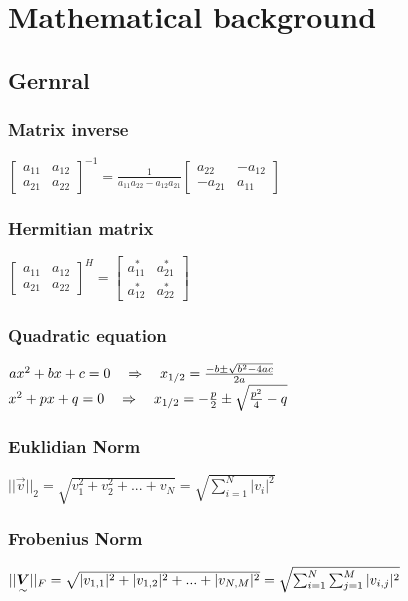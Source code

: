 \section{Mathematical background}
\subsection{Gernral}
\subsubsection{Matrix inverse}
$\begin{bmatrix}a_{11}&a_{12}\\a_{21}&a_{22}\end{bmatrix}^{-1}=
\frac{1}{a_{11}a_{22}-a_{12}a_{21}}\begin{bmatrix}a_{22}&-a_{12}\\-a_{21}&a_{11}\end{bmatrix}$
\subsubsection{Hermitian matrix}
$\begin{bmatrix}a_{11}&a_{12}\\a_{21}&a_{22}\end{bmatrix}^{H}=
\begin{bmatrix}a_{11}^*&a_{21}^*\\a_{12}^*&a_{22}^*\end{bmatrix}$

\subsubsection{Quadratic equation}
$ax^2+bx+c=0\quad\Rightarrow\quad x_{1/2}=\frac{-b\pm\sqrt{b^2-4ac}}{2a}$\\
$x^2 + px + q=0 \quad\Rightarrow\quad x_{1/2}=-\frac{p}{2} \pm \sqrt{\frac{p^2}{4}-q} $\\

\subsubsection{Euklidian Norm}
$||\vec{v}||_2=\sqrt{v_1^2 + v_2^2 + ... + v_N} = \sqrt{\sum_{i=1}^{N}|v_i|^2}$
\subsubsection{Frobenius Norm}
$||\underset{\sim}{\boldsymbol {V}}||_F=\sqrt{|v_{1,1}|^2 + |v_{1,2}|^2+... + |v_{N,M}|^2} =\sqrt{\sum_{i=1}^{N} \sum_{j=1}^{M}|v_{i,j}|^2}$
